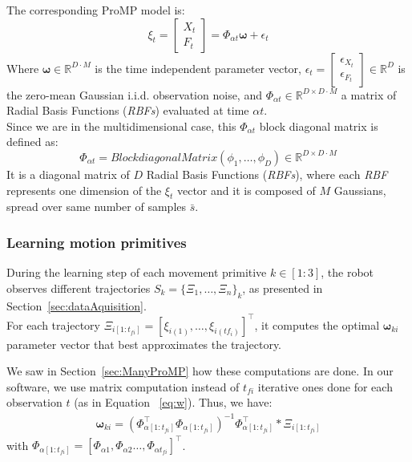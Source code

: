 \documentclass[utf8]{frontiersSCNS} %
\begin{document}
The corresponding ProMP model is:
$$\xi_t = \begin{bmatrix} X_t \\ F_t\end{bmatrix} = \Phi_{\alpha t} \boldsymbol{\omega} + \epsilon_t$$
Where $\boldsymbol{\omega} \in  \mathbb{R}^{D \cdot M}$ is the time independent parameter vector, $\epsilon_t= \begin{bmatrix} \epsilon_{X_t} \\ \epsilon_{F_t}\end{bmatrix} \in \mathbb{R}^D$ is the zero-mean Gaussian i.i.d. observation noise, and $\Phi_{\alpha t} \in \mathbb{R}^{D \times D \cdot M}$ a matrix of Radial Basis Functions (\textit{RBFs}) evaluated at time $\alpha t$.\\
Since we are in the multidimensional case, this $\Phi_{\alpha t}$ block diagonal matrix is defined as:
$$\Phi_{\alpha t}  = BlockdiagonalMatrix(\phi_1,\ldots,\phi_{D}) \in \mathbb{R}^{D \times D \cdot M} $$
It is a diagonal matrix of $D$ Radial Basis Functions (\textit{RBFs}), where each \textit{RBF} represents one dimension of the $\xi_t$ vector and it is composed of $M$ Gaussians, spread over  same number of samples $\bar{s}$.


\subsubsection{Learning motion primitives}
\label{learning}

During the learning step of each movement primitive $k \in [1:3]$, the robot observes different trajectories $S_k = \{\Xi_1,\ldots, \Xi_n\}_k$, as presented in Section~\ref{sec:dataAquisition}.\\
For each trajectory $\Xi_{i {[1:t_{fi}]}} = [\xi_{i(1)}, \ldots, \xi_{i(tf_i)}]^\top$, it computes the optimal $\boldsymbol{\omega}_{ki}$ parameter vector that best approximates the trajectory.

We saw in Section~\ref{sec:ManyProMP} how these computations are done. In our software, we use matrix computation instead of $t_{fi}$ iterative ones done for each observation $t$ (as in Equation ~\ref{eq:w}). Thus, we have:
\begin{eqnarray}
\boldsymbol{\omega}_{ki} = (\Phi_{\alpha [1:t_{fi}]}^\top \Phi_{\alpha [1:t_{fi}]})^{-1} \Phi_{\alpha [1:t_{fi}]}^\top * \Xi_{i {[1:t_{fi}]}}
\end{eqnarray}
with $\Phi_{\alpha [1:t_{fi}]} = [\Phi_{\alpha 1}, \Phi_{\alpha 2}\ldots,\Phi_{\alpha t_{fi}}]^\top$.
\end{document}
